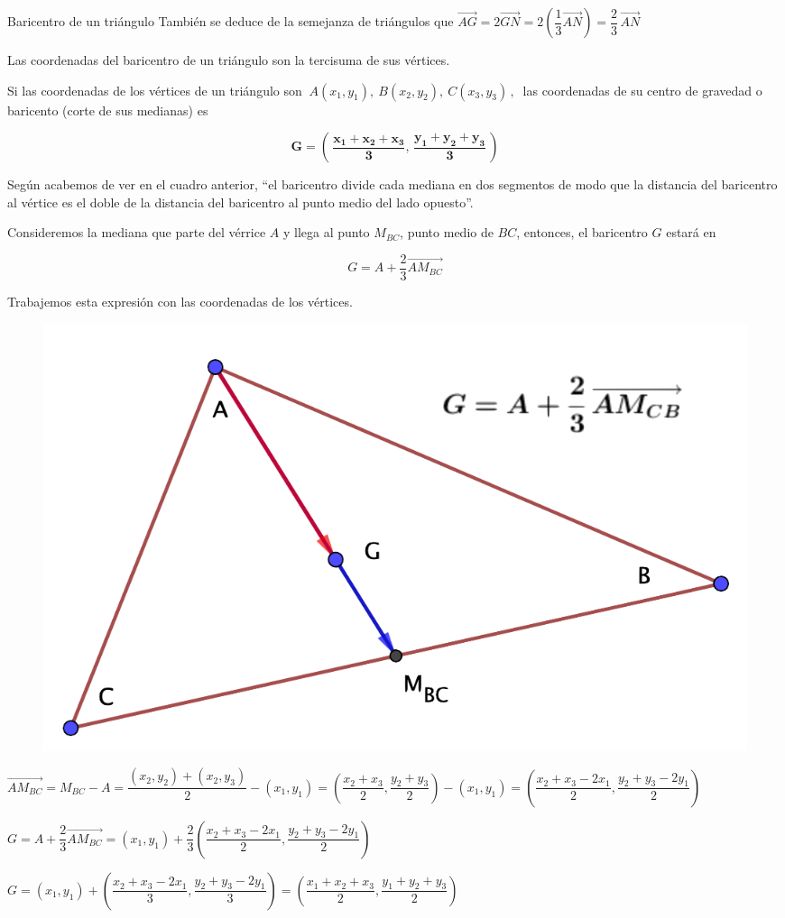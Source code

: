 \begin{myexampleblock}{Baricentro de un triángulo}
También se deduce de la semejanza de triángulos que  $\overrightarrow{AG}=2\overrightarrow{GN}=2\left( \dfrac 1 3 \overrightarrow{AN}\right) = \dfrac 2 3 \, \overrightarrow{AN}$
\end{myexampleblock}


\vspace{5mm} 
\begin{myalertblock}{Las coordenadas del baricentro de un triángulo son la tercisuma de sus vértices.}	

\vspace{2mm} Si las coordenadas de los vértices de un triángulo son $\ A(x_1,y_1),\ B(x_2,y_2),\ C(x_3,y_3)\, , \ $ las coordenadas de su centro de gravedad o baricento (corte de sus medianas) es 

$$\boldsymbol{ G=\left ( \,  \dfrac{x_1+x_2+x_3}{3}, \, \dfrac{y_1+y_2+y_3}{3}  \,\right) }$$


Según acabemos de ver en el cuadro anterior, ``el baricentro divide cada mediana en dos segmentos de modo que la distancia del baricentro al vértice es el doble de la distancia del baricentro al punto medio del lado opuesto''.

\begin{multicols}{2}	
Consideremos la mediana que parte del vérrice $A$ y llega al punto $M_{BC}$, punto medio de $BC$, entonces, el baricentro $G$ estará en 

$$G=A+\dfrac 2 3 \overrightarrow{AM_{BC}}$$ 

Trabajemos esta expresión con las coordenadas de los vértices.
\begin{figure}[H]
	\centering
	\includegraphics[width=.5\textwidth]{img-ga/ga27.png}
\end{figure}
\end{multicols}

$\overrightarrow{AM_{BC}}=M_{BC}-A=\dfrac{(x_2,y_2)+(x_2,y_3)}{2}-(x_1,y_1)=\left( \dfrac{x_2+x_3}{2},\dfrac{y_2+y_3}{2} \right)-(x_1,y_1)=
\left( \dfrac{x_2+x_3-2x_1}{2},\dfrac{y_2+y_3-2y_1}{2} \right)$

\vspace{2mm} $G=A+\dfrac 2 3 \overrightarrow{AM_{BC}}=(x_1,y_1)+\dfrac 23 \left( \dfrac{x_2+x_3-2x_1}{2},\dfrac{y_2+y_3-2y_1}{2} \right)$

\vspace{2mm} $G=(x_1,y_1)+\left( \dfrac{x_2+x_3-2x_1}{3},\dfrac{y_2+y_3-2y_1}{3} \right)=\left( \dfrac{x_1+x_2+x_3}{2},\dfrac{y_1+y_2+y_3}{2} \right)$ \QED

\end{myalertblock}





